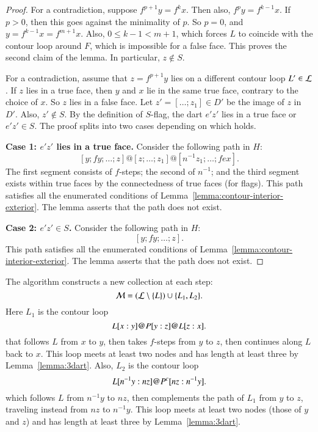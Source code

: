 \begin{proof} 
For a contradiction, suppose $f^{p+1} y = f^k x$. Then also, $f^p y = f^{k-1} x$.  If $p>0$, then this goes against the minimality of $p$.  So $p=0$, and $y=f^{k-1} x = f^{m+1} x$.  Also, $0\le k-1 < {m+1}$, which forces $L$ to coincide with the contour loop around $F$, which is impossible for a false face.  This proves the second claim of the lemma.  In particular, $z\not\in S$.

For a contradiction, assume that $z = f^{p+1} y$ lies on a different contour loop $L'\in {\cal L}$.  If $z$ lies in a true face, then $y$ and $x$ lie in the same true face, contrary to the choice of $x$.  So $z$ lies in a false face.  Let $z' = [\ldots;z_1]\in D'$ be the image of $z$ in $D'$.  Also,  $z'\not\in S$.  By the definition of $S$-flag, the dart $e'z'$ lies in a true face or $e'z'\in S$.  The proof splits into two cases depending on which holds.

{\bf Case 1: $e'z'$ lies in a true face.}  Consider the following path in $H$:
$$
[y;fy;\ldots;z] @ [z;\ldots;z_1] @ [n^{-1} z_1;\ldots;f e x].
$$
The first segment consists of $f$-steps; the second of $n^{-1}$; and the third segment exists within true faces by the connectedness of true faces (for flags).  This
path satisfies all the enumerated conditions of Lemma~\ref{lemma:contour-interior-exterior}.  The lemma asserts that the path does not exist.

{\bf Case 2: $e'z'\in S$.}   Consider the following path in $H$:
$$
[y;f y;\ldots;z].
$$
 This
path satisfies all the enumerated conditions of Lemma~\ref{lemma:contour-interior-exterior}.  The lemma asserts that the path does not exist.
\end{proof}


The algorithm constructs a new collection at each step:
$${\cal M} = ({\cal L}\setminus \{L\}) \cup \{L_1,L_2\}.$$
Here $L_1$ is the contour loop
$$
L[x:y] {{\operatorname{@}}} P[y:z] {{\operatorname{@}}} L[z:x].
$$
that follows $L$ from $x$ to $y$, then takes $f$-steps from $y$ to $z$, then continues along $L$ back to $x$.  This loop meets at least two nodes and has length at least three by Lemma~\ref{lemma:3dart}. Also, $L_2$ is the contour loop
$$
L[n^{-1}y:n z] {{\operatorname{@}}} P^c[n z:n^{-1}y].
$$
which follows $L$ from $n^{-1} y$ to $n z$, then complements the path of $L_1$ from $y$ to $z$, traveling instead from $n z$ to $n^{-1} y$.  This loop meets at least two nodes (those of $y$ and $z$) and has length at least three by Lemma~\ref{lemma:3dart}.

